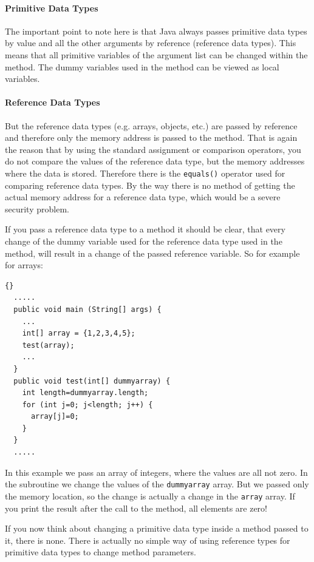 \paragraph{Primitive Data Types}
The important point to note here is that Java always
passes primitive data types by value and all the other
arguments by reference (reference data types). 
This means that all primitive
variables of the argument list can be changed within
the method. The dummy variables used in the method 
can be viewed as local variables.

\paragraph{Reference Data Types}
But the reference data types (e.g. arrays, objects, etc.)
are passed by reference and therefore only the memory
address is passed to the method. That is again the reason that
by using the standard assignment or comparison operators,
you do not compare the values of the reference data type, but
the memory addresses where the data is stored. Therefore there
is the \verb|equals()| operator used for comparing reference data
types. By the way there is no method
of getting the actual memory address for a reference data type,
which would be a severe security problem.

If you pass a reference data type to a method it should be
clear, that every change of the dummy variable used for
the reference data type used in the method, will result in a change
of the passed reference variable. So for example for arrays:
\begin{lstlisting}{}
  .....
  public void main (String[] args) {
    ...
    int[] array = {1,2,3,4,5};
    test(array);
    ...
  }
  public void test(int[] dummyarray) {
    int length=dummyarray.length;
    for (int j=0; j<length; j++) {
      array[j]=0;
    }
  }
  .....
\end{lstlisting}
In this example we pass an array of integers, where the values are all 
not zero. In the subroutine we change the values of the 
\verb|dummyarray| array.
But we passed only the memory location, so the change is actually
a change in the \verb|array| array. If you print the result after
the call to the method, all elements are zero!

If you now think about changing a primitive data type inside a method 
passed to it, there is none. There is actually 
no simple way of using reference types for primitive data types to
change method parameters. 

